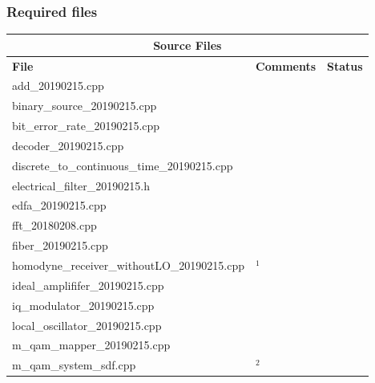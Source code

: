 	\subsubsection{Required files}\label{sec:requiredFilesMQAM}
	\begin{longtable}[h]{|l|l|l|}
		\hline
		\multicolumn{3}{|c|}{ \textbf{Source Files} } \\
		\hline
		\textbf{File}                                     & \textbf{Comments} & \textbf{Status} \\ \hline
		add\_20190215.cpp                                 &                   & 
		\checkmark \\ \hline
		binary\_source\_20190215.cpp                      &                   & 
		\checkmark \\ \hline
		bit\_error\_rate\_20190215.cpp                    &                   & 
		\checkmark \\ \hline
		decoder\_20190215.cpp                             &                   & 
		\checkmark \\ \hline
		discrete\_to\_continuous\_time\_20190215.cpp      &                   & 
		\checkmark \\ \hline
		electrical\_filter\_20190215.h                    &                   & 
		\checkmark \\ \hline
		edfa\_20190215.cpp                                          
		&                   & 
		\checkmark \\ \hline
		fft\_20180208.cpp                                 &                   & \checkmark \\ \hline
		fiber\_20190215.cpp                                         
		&                   & 
		\checkmark \\ \hline
		homodyne\_receiver\_withoutLO\_20190215.cpp                 & 
		$^{1}$            & 
		\checkmark \\ \hline
		ideal\_amplififer\_20190215.cpp                   &                   & 
		\checkmark \\ \hline
		iq\_modulator\_20190215.cpp                       &                   & 
		\checkmark \\ \hline
		local\_oscillator\_20190215.cpp                   &                   & 
		\checkmark \\ \hline
		m\_qam\_mapper\_20190215.cpp                      &                   & 
		\checkmark \\ \hline
		m\_qam\_system\_sdf.cpp                           & $^{2}$            & \checkmark \\ \hline

\end{longtable}
